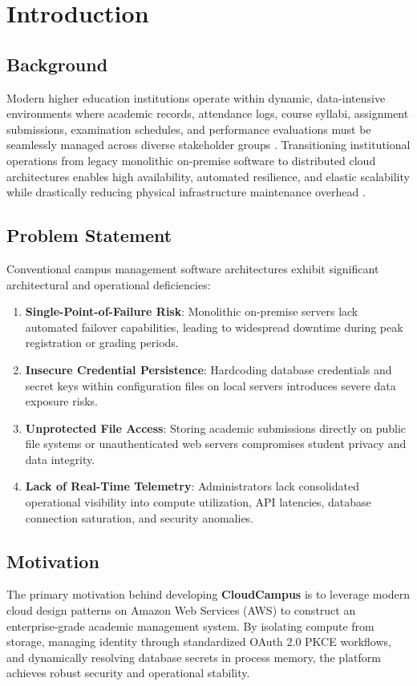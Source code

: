 \newpage
\section{Introduction}

\subsection{Background}
Modern higher education institutions operate within dynamic, data-intensive environments where academic records, attendance logs, course syllabi, assignment submissions, examination schedules, and performance evaluations must be seamlessly managed across diverse stakeholder groups \cite{iiitdm_kurnool}. Transitioning institutional operations from legacy monolithic on-premise software to distributed cloud architectures enables high availability, automated resilience, and elastic scalability while drastically reducing physical infrastructure maintenance overhead \cite{aws_ec2}.

\subsection{Problem Statement}
Conventional campus management software architectures exhibit significant architectural and operational deficiencies:
\begin{enumerate}[leftmargin=*,itemsep=1pt]
    \item \textbf{Single-Point-of-Failure Risk}: Monolithic on-premise servers lack automated failover capabilities, leading to widespread downtime during peak registration or grading periods.
    \item \textbf{Insecure Credential Persistence}: Hardcoding database credentials and secret keys within configuration files on local servers introduces severe data exposure risks.
    \item \textbf{Unprotected File Access}: Storing academic submissions directly on public file systems or unauthenticated web servers compromises student privacy and data integrity.
    \item \textbf{Lack of Real-Time Telemetry}: Administrators lack consolidated operational visibility into compute utilization, API latencies, database connection saturation, and security anomalies.
\end{enumerate}

\subsection{Motivation}
The primary motivation behind developing \textbf{CloudCampus} is to leverage modern cloud design patterns on Amazon Web Services (AWS) to construct an enterprise-grade academic management system. By isolating compute from storage, managing identity through standardized OAuth 2.0 PKCE workflows, and dynamically resolving database secrets in process memory, the platform achieves robust security and operational stability.

